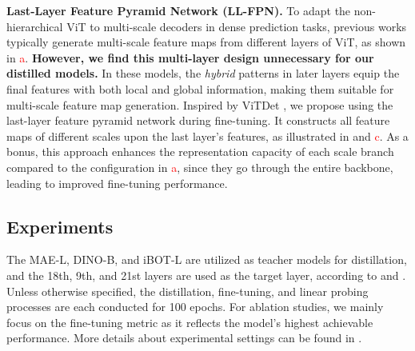 \textbf{Last-Layer Feature Pyramid Network (LL-FPN).} To adapt the non-hierarchical ViT to multi-scale decoders in dense prediction tasks, previous works \citep{mae,iBOT} typically generate multi-scale feature maps from different layers of ViT, as shown in \textcolor{red}{a}. \textbf{However, we find this multi-layer design unnecessary for our distilled models.} In these models, the \textit{hybrid} patterns in later layers equip the final features with both local and global information, making them suitable for multi-scale feature map generation. Inspired by ViTDet \citep{vitdet}, we propose using the last-layer feature pyramid network during fine-tuning. It constructs all feature maps of different scales upon the last layer's features, as illustrated in  and \textcolor{red}{c}. As a bonus, this approach enhances the representation capacity of each scale branch compared to the configuration in \textcolor{red}{a}, since they go through the entire backbone, leading to improved fine-tuning performance.

 


\subsection{Experiments}
\label{sec:unip_experiments}

The MAE-L, DINO-B, and iBOT-L are utilized as teacher models for distillation, and the 18th, 9th, and 21st layers are used as the target layer, according to  and . Unless otherwise specified, the distillation, fine-tuning, and linear probing processes are each conducted for 100 epochs. For ablation studies, we mainly focus on the fine-tuning metric as it reflects the model's highest achievable performance. More details about experimental settings can be found in .



